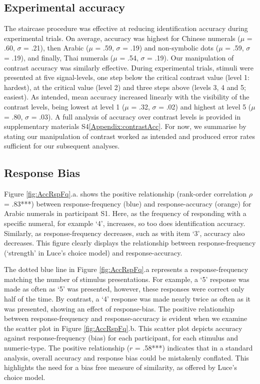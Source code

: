 \subsection{Experimental accuracy}
The staircase procedure was effective at reducing identification accuracy during experimental trials. On average, accuracy was highest for Chinese numerals ($\mu$ = .60, $\sigma$ = .21), then Arabic ($\mu$ = .59, $\sigma$ = .19) and non-symbolic dots ($\mu$ = .59, $\sigma$ = .19), and finally, Thai numerals ($\mu$ = .54, $\sigma$ = .19). Our manipulation of contrast accuracy was similarly effective. During experimental trials, stimuli were presented at five signal-levels, one step below the critical contrast value (level 1: hardest), at the critical value (level 2) and three steps above (levels 3, 4 and 5; easiest). As intended, mean accuracy increased linearly with the visibility of the contrast levels, being lowest at level 1 ($\mu$ = .32, $\sigma$ = .02) and highest at level 5 ($\mu$ = .80, $\sigma$ = .03). A full analysis of accuracy over contrast levels is provided in supplementary materials S4\ref{Appendix:contrastAcc}. For now, we  summarise by stating our manipulation of contrast worked as intended and produced error rates sufficient for our subsequent analyses.


\subsection{Response Bias}
Figure \ref{fig:AccRspFq}.a. shows the positive relationship (rank-order correlation $\rho$ = .83***) between response-frequency (blue) and response-accuracy (orange) for Arabic numerals in participant S1. Here, as the frequency of responding with a specific numeral, for example `4', increases, so too does identification accuracy. Similarly, as response-frequency decreases, such as with item `3', accuracy also decreases. This figure clearly displays the relationship between response-frequency (`strength' in Luce's choice model) and response-accuracy. 

The dotted blue line in Figure \ref{fig:AccRspFq}.a represents a response-frequency matching the number of stimulus presentations. For example, a `5' response was made as often as `5' was presented, however, these responses were correct only half of the time. By contrast, a `4' response was made nearly twice as often as it was presented, showing an effect of response-bias. The positive relationship between response-frequency and response-accuracy is evident when we examine the scatter plot in Figure \ref{fig:AccRspFq}.b. This scatter plot depicts accuracy against response-frequency (bias) for each participant, for each stimulus and numeric-type. The positive relationship ($r$ = .58***) indicates that in a standard analysis, overall accuracy and response bias could be mistakenly conflated. This highlights the need for a bias free measure of similarity, as offered by Luce's choice model.

